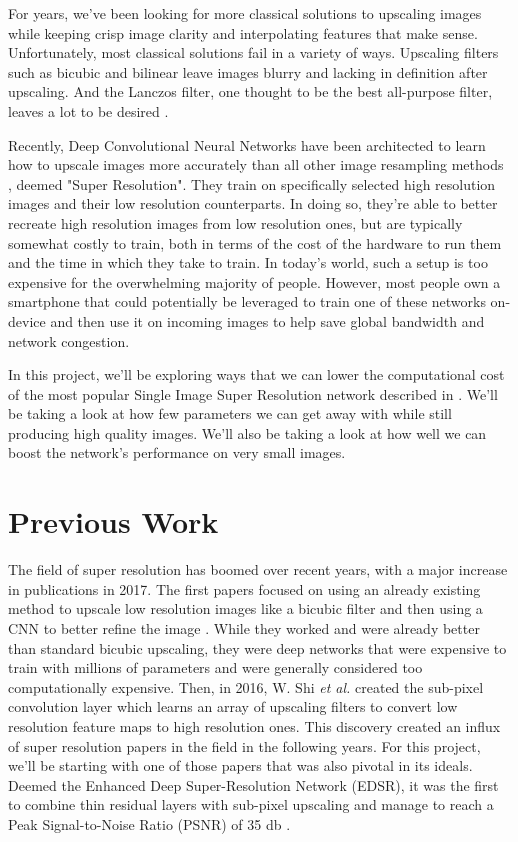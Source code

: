 \documentclass[conference]{IEEEtran}
\begin{document}
For years, we've been looking for more classical solutions to upscaling images while keeping crisp image clarity and interpolating features that make sense.
Unfortunately, most classical solutions fail in a variety of ways.
Upscaling filters such as bicubic and bilinear leave images blurry and lacking in definition after upscaling.
And the Lanczos filter, one thought to be the best all-purpose filter, leaves a lot to be desired \cite{b4}.

Recently, Deep Convolutional Neural Networks have been architected to learn how to upscale images more accurately than all other image resampling methods \cite{b5}, deemed "Super Resolution".
They train on specifically selected high resolution images and their low resolution counterparts.
In doing so, they're able to better recreate high resolution images from low resolution ones, but are typically somewhat costly to train, both in terms of the cost of the hardware to run them and the time in which they take to train.
In today's world, such a setup is too expensive for the overwhelming majority of people.
However, most people own a smartphone that could potentially be leveraged to train one of these networks on-device and then use it on incoming images to help save global bandwidth and network congestion.

In this project, we'll be exploring ways that we can lower the computational cost of the most popular Single Image Super Resolution network described in \cite{b6}.
We'll be taking a look at how few parameters we can get away with while still producing high quality images.
We'll also be taking a look at how well we can boost the network's performance on very small images.

\section{Previous Work}

The field of super resolution has boomed over recent years, with a major increase in publications in 2017.
The first papers focused on using an already existing method to upscale low resolution images like a bicubic filter and then using a CNN to better refine the image \cite{b5}.
While they worked and were already better than standard bicubic upscaling, they were deep networks that were expensive to train with millions of parameters and were generally considered too computationally expensive.
Then, in 2016, W. Shi \textit{et al.} \cite{b6} created the sub-pixel convolution layer which learns an array of upscaling filters to convert low resolution feature maps to high resolution ones.
This discovery created an influx of super resolution papers in the field in the following years.
For this project, we'll be starting with one of those papers that was also pivotal in its ideals.
Deemed the Enhanced Deep Super-Resolution Network (EDSR), it was the first to combine thin residual layers with sub-pixel upscaling and manage to reach a Peak Signal-to-Noise Ratio (PSNR) of 35 db \cite{b1}.
\end{document}
